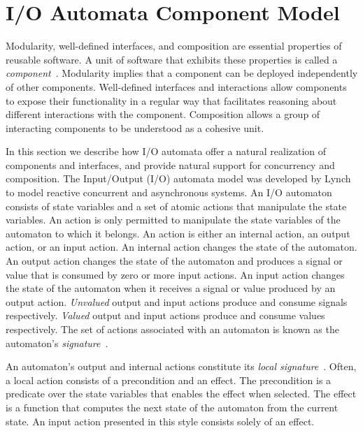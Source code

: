 \section{I/O Automata Component Model\label{component_model}}

Modularity, well-defined interfaces, and composition are essential properties of reusable software.
A unit of software that exhibits these properties is called a \emph{component}~\cite{szyperski2002component}.
Modularity implies that a component can be deployed independently of other components.
Well-defined interfaces and interactions allow components to expose their functionality in a regular way that facilitates reasoning about different interactions with the component.
Composition allows a group of interacting components to be understood as a cohesive unit.

In this section we describe how I/O automata offer a natural realization of components and interfaces, and provide natural support for concurrency and composition.
The Input/Output (I/O) automata model was developed by Lynch~\cite{lynch1996distributed} to model reactive concurrent and asynchronous systems.
An I/O automaton consists of state variables and a set of atomic actions that manipulate the state variables.
An action is only permitted to manipulate the state variables of the automaton to which it belongs.
An action is either an internal action, an output action, or an input action.
An internal action changes the state of the automaton.
An output action changes the state of the automaton and produces a signal or value that is consumed by zero or more input actions.
An input action changes the state of the automaton when it receives a signal or value produced by an output action.
\emph{Unvalued} output and input actions produce and consume signals respectively.
\emph{Valued} output and input actions produce and consume values respectively.
The set of actions associated with an automaton is known as the automaton's \emph{signature}~\cite{lynch1996distributed}.

An automaton's output and internal actions constitute its \emph{local signature}~\cite{lynch1996distributed}.
Often, a local action consists of a precondition and an effect.
The precondition is a predicate over the state variables that enables the effect when selected.
The effect is a function that computes the next state of the automaton from the current state.
An input action presented in this style consists solely of an effect.

